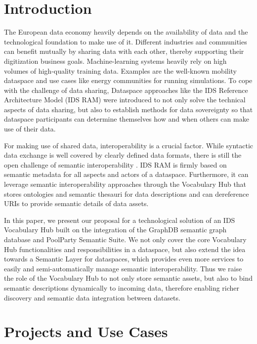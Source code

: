 \documentclass[
  super,
  preprint,
  3p]{elsarticle}
\begin{document}
\section{Introduction}\label{introduction}

The European data economy heavily depends on the availability of data
and the technological foundation to make use of it. Different industries
and communities can benefit mutually by sharing data with each other,
thereby supporting their digitization business goals. Machine-learning
systems heavily rely on high volumes of high-quality training data.
Examples are the well-known mobility dataspace and use cases like energy
communities for running simulations. To cope with the challenge of data
sharing, Dataspace approaches like the IDS Reference Architecture Model
(IDS RAM) were introduced to not only solve the technical aspects of
data sharing, but also to establish methods for data sovereignty so that
dataspace participants can determine themselves how and when others can
make use of their data.

For making use of shared data, interoperability is a crucial factor.
While syntactic data exchange is well covered by clearly defined data
formats, there is still the open challenge of semantic interoperability
\citep{woutervandenbergSemanticInteroperabilityData2024}. IDS RAM is
firmly based on semantic metadata for all aspects and actors of a
dataspace. Furthermore, it can leverage semantic interoperability
approaches through the Vocabulary Hub \citep{IDSARAMVocabulary2024} that
stores ontologies and semantic thesauri for data descriptions and can
dereference URIs to provide semantic details of data assets.

In this paper, we present our proposal for a technological solution of
an IDS Vocabulary Hub built on the integration of the GraphDB semantic
graph database and PoolParty Semantic Suite. We not only cover the core
Vocabulary Hub functionalities and responsibilities in a dataspace, but
also extend the idea towards a Semantic Layer for dataspaces, which
provides even more services to easily and semi-automatically manage
semantic interoperability. Thus we raise the role of the Vocabulary Hub
\citep{stornebrinkmichielVocabularyHubSemantic2023} to not only store
semantic assets, but also to bind semantic descriptions dynamically to
incoming data, therefore enabling richer discovery and semantic data
integration between datasets.

\section{Projects and Use Cases}\label{projects-and-use-cases}
\end{document}
